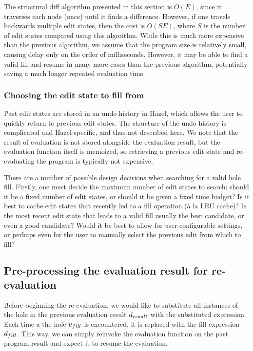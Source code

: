 The structural diff algorithm presented in this section is $O(E)$, since it traverses each node (once) until it finds a difference. However, if one travels backwards multiple edit states, then the cost is $O(SE)$, where $S$ is the number of edit states compared using this algorithm. While this is much more expensive than the previous algorithm, we assume that the program size is relatively small, causing delay only on the order of milliseconds. However, it may be able to find a valid fill-and-resume in many more cases than the previous algorithm, potentially saving a much longer repeated evaluation time.

\subsubsection{Choosing the edit state to fill from}
\label{sec:far-past-edit-states}

Past edit states are stored in an undo history in Hazel, which allows the user to quickly return to previous edit states. The structure of the undo history is complicated and Hazel-specific, and thus not described here. We note that the result of evaluation is not stored alongside the evaluation result, but the evaluation function itself is memoized, so retrieving a previous edit state and re-evaluating the program is typically not expensive.


There are a number of possible design decisions when searching for a valid hole fill. Firstly, one must decide the maximum number of edit states to search: should it be a fixed number of edit states, or should it be given a fixed time budget? Is it best to cache edit states that recently led to a fill operation (\`a la LRU cache)? Is the most recent edit state that leads to a valid fill usually the best candidate, or even a good candidate? Would it be best to allow for user-configurable settings, or perhaps even for the user to manually select the previous edit from which to fill?


\subsection{Pre-processing the evaluation result for re-evaluation}
\label{sec:far-preprocessing}

Before beginning the re-evaluation, we would like to substitute all instances of the hole in the previous evaluation result $d_{result}$ with the substituted expression. Each time a the hole $u_{fill}$ is encountered, it is replaced with the fill expression $d_{fill}$. This way, we can simply reinvoke the evaluation function on the past program result and expect it to resume the evaluation.

